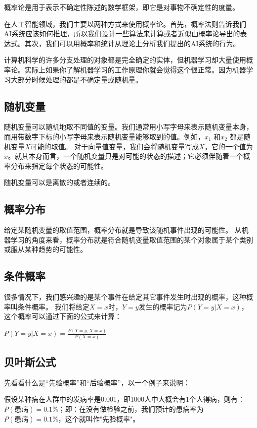 \documentclass[11pt]{book}
\newcounter{#2}
\newcounter{#2}[#1]
\numberwithin{#2}{#1}
\begin{document}
概率论是用于表示不确定性陈述的数学框架，即它是对事物不确定性的度量。

在人工智能领域，我们主要以两种方式来使用概率论。首先，概率法则告诉我们AI系统应该如何推理，所以我们设计一些算法来计算或者近似由概率论导出的表达式。其次，我们可以用概率和统计从理论上分析我们提出的AI系统的行为。

计算机科学的许多分支处理的对象都是完全确定的实体，但机器学习却大量使用概率论。实际上如果你了解机器学习的工作原理你就会觉得这个很正常。因为机器学习大部分时候处理的都是不确定量或随机量。

\subsection{随机变量}

随机变量可以随机地取不同值的变量。我们通常用小写字母来表示随机变量本身，而用带数字下标的小写字母来表示随机变量能够取到的值。例如，$ x_{1} $ 和$ x_{2} $  都是随机变量$ X $可能的取值。
对于向量值变量，我们会将随机变量写成$ X $，它的一个值为$ x $。就其本身而言，一个随机变量只是对可能的状态的描述；它必须伴随着一个概率分布来指定每个状态的可能性。

随机变量可以是离散的或者连续的。

\subsection{概率分布}

给定某随机变量的取值范围，概率分布就是导致该随机事件出现的可能性。
从机器学习的角度来看，概率分布就是符合随机变量取值范围的某个对象属于某个类别或服从某种趋势的可能性。
\subsection{条件概率}

很多情况下，我们感兴趣的是某个事件在给定其它事件发生时出现的概率，这种概率叫条件概率。
我们将给定$ X=x $时，$ Y=y $发生的概率记为$ P\left( Y=y|X=x \right)  $，这个概率可以通过下面的公式来计算：

$ P\left( Y=y|X=x  \right) =\frac{P\left( Y=y,X=x \right) }{P\left( X=x \right) }  $

\subsection{贝叶斯公式}

先看看什么是“先验概率”和“后验概率”，以一个例子来说明：

假设某种病在人群中的发病率是0.001，即1000人中大概会有1个人得病，则有：$ P(患病) = 0.1\% $；即：在没有做检验之前，我们预计的患病率为$ P(患病)=0.1\% $，这个就叫作"先验概率"。 
\end{document}
